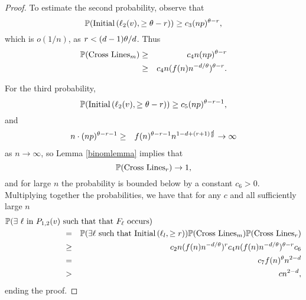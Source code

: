 \begin{proof}
To estimate the second probability, observe that 
$$\mathbb{P}(\hbox{Initial}\left(\ell_2(v), \geq \theta-r\right))\ge c_3 (np)^{\theta-r},$$
which is $o(1/n)$, as $r<(d-1)\theta/d$. Thus 
\begin{eqnarray*}
\mathbb{P}(\hbox{Cross Lines}_m)
 &\geq& c_4 n (np)^{\theta- r}\\
 &\geq& c_4 n (f(n)n^{-d/\theta})^{\theta- r}.
\end{eqnarray*}

For the third probability, 
$$\mathbb{P}(\hbox{Initial}\left(\ell_2(v), \geq \theta-r\right))\ge c_5 (np)^{\theta-r-1},$$
and 
\begin{eqnarray*}
n\cdot (np)^{\theta-r-1}
 &\geq&   f(n)^{\theta - r - 1}n^{1-d+(r+1)\frac{d}{\theta}} \to \infty
\end{eqnarray*}
as $n\to\infty$, 
so Lemma \ref{binomlemma} implies that 
$$
\mathbb{P}(\hbox{Cross Lines}_r) \to 1,
$$
and for large $n$ the probability is bounded below by a constant $c_6>0$.
Multiplying together the probabilities, we have that for any $c$ and all sufficiently large $n$
\begin{eqnarray*}
\lefteqn{\prob(\text{$\exists$ $\Ln$ in $P_{1,2}(v)$ such that that $F_\Ln$ occurs} )}\hspace{1in}&&\\
 &=&\prob(\exists \Ln \text{ such that }\I{\Ln_l}{\noodle})\prob( \Gonez)\prob( \Gtwoz)\\
 &\geq& c_2n(f(n)n^{-d/\threshold})^{\noodle}c_4n (f(n)n^{-d/\threshold})^{\threshold- \noodle}c_6\\
&=& c_7f(n)^\threshold n^{2-d} \\
&>& c n^{2-d},
\end{eqnarray*}
ending the proof.
\begin{comment}
The case when $d=\threshold=3$ is 
almost identical except the roles of the first and second events are reversed. This happens because $\noodle=1<\threshold-\noodle =2$. This is the only choice of $d$ and $\threshold$ for which $\noodle < \threshold -\noodle$. We leave the details to the reader.
\end{comment}
\end{proof}

